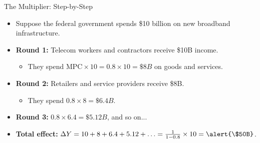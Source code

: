\documentclass[aspectratio=169]{beamer}
\begin{document}
\begin{frame}{The Multiplier: Step-by-Step}
\transfade
\begin{itemize}
  \item Suppose the federal government spends \alert{\$10 billion} on new broadband infrastructure.
  \item \textbf{Round 1:} Telecom workers and contractors receive \$10B income.
  \begin{itemize}
    \item They spend $\text{MPC} \times 10 = 0.8 \times 10 = \$8B$ on goods and services.
  \end{itemize}
  \item \textbf{Round 2:} Retailers and service providers receive \$8B.
  \begin{itemize}
    \item They spend $0.8 \times 8 = \$6.4B$.
  \end{itemize}
  \item \textbf{Round 3:} $0.8 \times 6.4 = \$5.12B$, and so on...
  \item \textbf{Total effect:} $\Delta Y = 10 + 8 + 6.4 + 5.12 + \ldots = \frac{1}{1-0.8} \times 10 = \alert{\$50B}$.
\end{itemize}
\end{frame}
\end{document}
